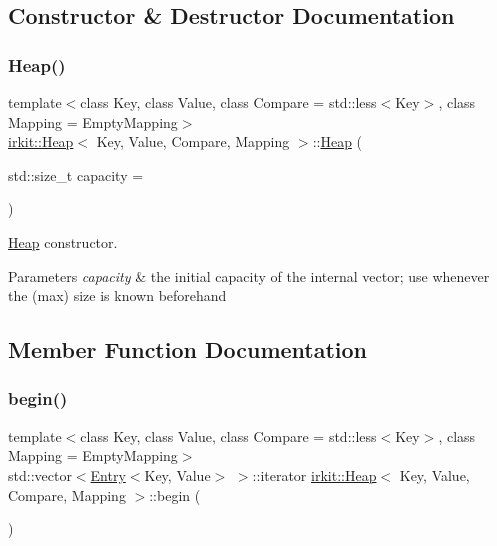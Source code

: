 \subsection{Constructor \& Destructor Documentation}
\mbox{\label{classirkit_1_1Heap_ac262b1efe6564321f3f8476dc8665eaf}} 
\subsubsection{\texorpdfstring{Heap()}{Heap()}}
{\footnotesize\ttfamily template$<$class Key, class Value, class Compare = std\+::less$<$\+Key$>$, class Mapping = Empty\+Mapping$>$ \\
\hyperlink{classirkit_1_1Heap}{irkit\+::\+Heap}$<$ Key, Value, Compare, Mapping $>$\+::\hyperlink{classirkit_1_1Heap}{Heap} (\begin{DoxyParamCaption}\item[{std\+::size\+\_\+t}]{capacity = {} }\end{DoxyParamCaption})\hspace{0.3cm}{\ttfamily [inline]}}

\hyperlink{classirkit_1_1Heap}{Heap} constructor.


\begin{DoxyParams}{Parameters}
{\em capacity} & the initial capacity of the internal vector; use whenever the (max) size is known beforehand \\
\hline
\end{DoxyParams}


\subsection{Member Function Documentation}
\mbox{\label{classirkit_1_1Heap_af996708917bb42b8cc660988c5c5ed62}} 
\subsubsection{\texorpdfstring{begin()}{begin()}}
{\footnotesize\ttfamily template$<$class Key, class Value, class Compare = std\+::less$<$\+Key$>$, class Mapping = Empty\+Mapping$>$ \\
std\+::vector$<$\hyperlink{structirkit_1_1Entry}{Entry}$<$Key, Value$>$ $>$\+::iterator \hyperlink{classirkit_1_1Heap}{irkit\+::\+Heap}$<$ Key, Value, Compare, Mapping $>$\+::begin (\begin{DoxyParamCaption}{ }\end{DoxyParamCaption})\hspace{0.3cm}{\ttfamily [inline]}}

